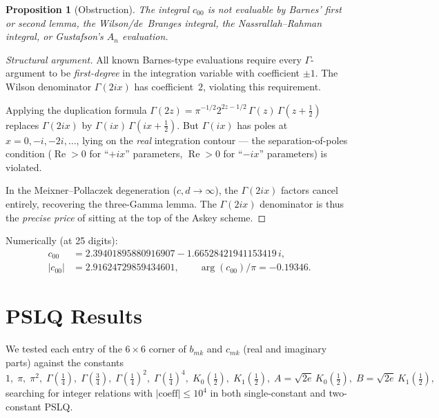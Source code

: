 \documentclass[11pt,a4paper]{article}
\newtheorem{proposition}{Proposition}[section]
\begin{document}
\begin{proposition}[Obstruction]
The integral $c_{00}$ is not evaluable by Barnes' first or second
lemma, the Wilson/de~Branges integral, the Nassrallah--Rahman integral,
or Gustafson's $A_n$ evaluation.
\end{proposition}

\begin{proof}[Structural argument]
All known Barnes-type evaluations require every $\Gamma$-argument to
be \emph{first-degree} in the integration variable with coefficient
$\pm 1$.  The Wilson denominator $\Gamma(2ix)$ has coefficient~$2$,
violating this requirement.

Applying the duplication formula $\Gamma(2z) = \pi^{-1/2}
2^{2z-1/2}\,\Gamma(z)\,\Gamma(z+\tfrac12)$ replaces $\Gamma(2ix)$
by $\Gamma(ix)\,\Gamma(ix+\tfrac12)$.  But $\Gamma(ix)$ has poles at
$x = 0, -i, -2i, \ldots$, lying on the \emph{real} integration
contour --- the separation-of-poles condition
($\operatorname{Re} > 0$ for ``$+ix$'' parameters,
$\operatorname{Re} > 0$ for ``$-ix$'' parameters) is violated.

In the Meixner--Pollaczek degeneration ($c, d \to \infty$), the
$\Gamma(2ix)$ factors cancel entirely, recovering the three-Gamma
lemma.  The $\Gamma(2ix)$ denominator is thus the \emph{precise price}
of sitting at the top of the Askey scheme.
\end{proof}

Numerically (at 25 digits):
\begin{align*}
  c_{00} &= 2.39401895880916907 - 1.66528421941153419\, i, \\
  |c_{00}| &= 2.91624729859434601, \qquad
  \arg(c_{00})/\pi = -0.19346.
\end{align*}

\section{PSLQ Results}

We tested each entry of the $6 \times 6$ corner of $b_{mk}$ and
$c_{mk}$ (real and imaginary parts) against the constants
\[
  1, \; \pi, \; \pi^2, \; \Gamma(\tfrac14), \; \Gamma(\tfrac34), \;
  \Gamma(\tfrac14)^2, \; \Gamma(\tfrac14)^4, \;
  K_0(\tfrac12), \; K_1(\tfrac12), \;
  A = \sqrt{2e}\,K_0(\tfrac12), \; B = \sqrt{2e}\,K_1(\tfrac12),
\]
searching for integer relations with $|\text{coeff}| \le 10^4$ in
both single-constant and two-constant PSLQ.
\end{document}
